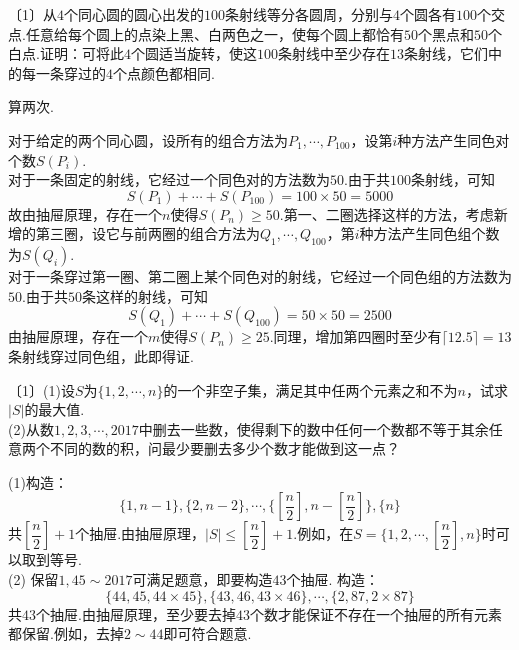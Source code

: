 \documentclass[cn,hazy,black,10pt,normal]{elegantnote}
\newenvironment{guess}{
  \color{guess}}{\newline \color{black}}
\newcommand{\nd}[1]{〔#1〕}
\begin{document}
\begin{problem} %
	\nd{1}从$4$个同心圆的圆心出发的$100$条射线等分各圆周，分别与$4$个圆各有$100$个交点.任意给每个圆上的点染上黑、白两色之一，使每个圆上都恰有$50$个黑点和$50$个白点.证明：可将此$4$个圆适当旋转，使这$100$条射线中至少存在$13$条射线，它们中的每一条穿过的$4$个点颜色都相同.
\end{problem}
\begin{hint}
	算两次.
\end{hint}
\begin{solution}
	对于给定的两个同心圆，设所有的组合方法为$P_1, \cdots ,P_{100}$，设第$i$种方法产生同色对个数$S(P_i)$. \\
	对于一条固定的射线，它经过一个同色对的方法数为$50$.由于共$100$条射线，可知$$S(P_1) + \cdots + S(P_{100}) = 100 \times 50 = 5000$$
	故由抽屉原理，存在一个$n$使得$S(P_n) \geq 50$.第一、二圈选择这样的方法，考虑新增的第三圈，设它与前两圈的组合方法为$Q_1, \cdots ,Q_{100}$，第$i$种方法产生同色组个数为$S(Q_i)$. \\
	对于一条穿过第一圈、第二圈上某个同色对的射线，它经过一个同色组的方法数为$50$.由于共$50$条这样的射线，可知$$S(Q_1) + \cdots + S(Q_{100}) = 50 \times 50 = 2500$$
	由抽屉原理，存在一个$m$使得$S(P_n) \geq 25$.同理，增加第四圈时至少有$\lceil 12.5 \rceil = 13$条射线穿过同色组，此即得证.
\end{solution}

\begin{problem} %
	\nd{1}(1)设$S$为$\{ 1,2, \cdots ,n \}$的一个非空子集，满足其中任两个元素之和不为$n$，试求$|S|$的最大值. \\
	(2)从数$1,2,3, \cdots ,2017$中删去一些数，使得剩下的数中任何一个数都不等于其余任意两个不同的数的积，问最少要删去多少个数才能做到这一点？
\end{problem}
\begin{solution}
	(1)构造：$$\{ 1,n-1 \},\{ 2,n-2 \}, \cdots , \{ \left[ \frac{n}{2} \right], n-\left[ \frac{n}{2} \right] \},\{ n \}$$
	共$ \left[ \dfrac{n}{2} \right]+1$个抽屉.由抽屉原理，$|S| \leq \left[ \dfrac{n}{2} \right]+1$.例如，在$S = \{ 1,2, \cdots , \left[ \dfrac{n}{2} \right] ,n \}$时可以取到等号. \\
	(2)\begin{guess}
		保留$1,45 \sim 2017$可满足题意，即要构造$43$个抽屉.
	\end{guess}
	构造：$$\{ 44,45,44 \times 45 \}, \{ 43,46,43 \times 46 \}, \cdots , \{ 2,87,2\times 87 \}$$
	共$43$个抽屉.由抽屉原理，至少要去掉$43$个数才能保证不存在一个抽屉的所有元素都保留.例如，去掉$2 \sim 44$即可符合题意.
\end{solution}
\end{document}
